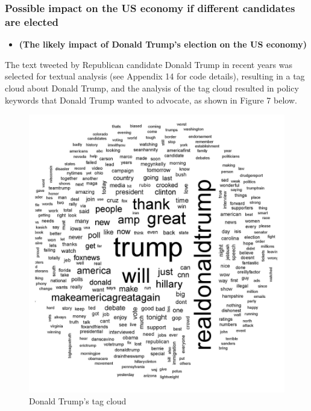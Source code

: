 \documentclass{apmcmthesis}
\begin{document}
\subsubsection{Possible impact on the US economy if different candidates are elected}
\begin{itemize}
	\item \textbf{(The likely impact of Donald Trump's election on the US economy)} 
\end{itemize}
The text tweeted by Republican candidate Donald Trump in recent years was selected for textual analysis (see Appendix 14 for code details), resulting in a tag cloud about Donald Trump, and the analysis of the tag cloud resulted in policy keywords that Donald Trump wanted to advocate, as shown in Figure 7 below.
\begin{figure}[H]
	\centering
	\includegraphics[width=\linewidth]{DT.jpeg}
	\caption{Donald Trump's tag cloud}
\end{figure}
\end{document}
